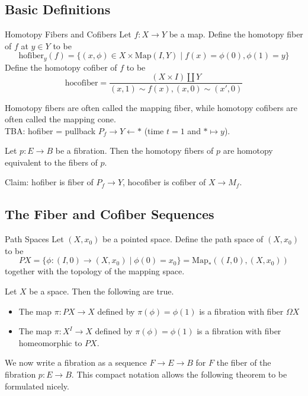 \documentclass[a4paper]{article}
\begin{document}
\subsection{Basic Definitions}
\begin{defn}{Homotopy Fibers and Cofibers}{} Let $f:X\to Y$ be a map. Define the homotopy fiber of $f$ at $y\in Y$ to be $$\text{hofiber}_y(f)=\{(x,\phi)\in X\times\text{Map}(I,Y)\;|\;f(x)=\phi(0), \phi(1)=y\}$$ Define the homotopy cofiber of $f$ to be $$\text{hocofiber}=\frac{(X\times I)\amalg Y}{(x,1)\sim f(x),(x,0)\sim(x',0)}$$
\end{defn}

Homotopy fibers are often called the mapping fiber, while homotopy cofibers are often called the mapping cone. \\

TBA: hofiber = pullback $P_f\to Y\leftarrow\ast$ (time $t=1$ and $\ast\mapsto y$). 

\begin{prp}{}{} Let $p:E\to B$ be a fibration. Then the homotopy fibers of $p$ are homotopy equivalent to the fibers of $p$. 
\end{prp}

Claim: hofiber is fiber of $P_f\to Y$, hocofiber is cofiber of $X\to M_f$. 

\subsection{The Fiber and Cofiber Sequences}
\begin{defn}{Path Spaces}{} Let $(X,x_0)$ be a pointed space. Define the path space of $(X,x_0)$ to be $$PX=\{\phi:(I,0)\to(X,x_0)\;|\;\phi(0)=x_0\}=\text{Map}_\ast((I,0),(X,x_0))$$ together with the topology of the mapping space. 
\end{defn}

\begin{thm}{}{} Let $X$ be a space. Then the following are true. 
\begin{itemize}
\item The map $\pi:PX\to X$ defined by $\pi(\phi)=\phi(1)$ is a fibration with fiber $\Omega X$
\item The map $\pi:X^I\to X$ defined by $\pi(\phi)=\phi(1)$ is a fibration with fiber homeomorphic to $PX$. 
\end{itemize}
\end{thm}

We now write a fibration as a sequence $F\to E\to B$ for $F$ the fiber of the fibration $p:E\to B$. This compact notation allows the following theorem to be formulated nicely. 
\end{document}
